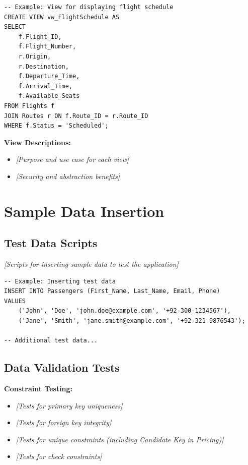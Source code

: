 \documentclass[12pt,a4paper,openany]{report}
\begin{document}
\begin{lstlisting}[caption={Sample View - Flight Schedule}]
-- Example: View for displaying flight schedule
CREATE VIEW vw_FlightSchedule AS
SELECT 
    f.Flight_ID,
    f.Flight_Number,
    r.Origin,
    r.Destination,
    f.Departure_Time,
    f.Arrival_Time,
    f.Available_Seats
FROM Flights f
JOIN Routes r ON f.Route_ID = r.Route_ID
WHERE f.Status = 'Scheduled';
\end{lstlisting}

\textbf{View Descriptions:}
\begin{itemize}
    \item \textit{[Purpose and use case for each view]}
    \item \textit{[Security and abstraction benefits]}
\end{itemize}

\section{Sample Data Insertion}

\subsection{Test Data Scripts}

\textit{[Scripts for inserting sample data to test the application]}

\begin{lstlisting}[caption={Sample Data Insertion}]
-- Example: Inserting test data
INSERT INTO Passengers (First_Name, Last_Name, Email, Phone) 
VALUES 
    ('John', 'Doe', 'john.doe@example.com', '+92-300-1234567'),
    ('Jane', 'Smith', 'jane.smith@example.com', '+92-321-9876543');

-- Additional test data...
\end{lstlisting}

\subsection{Data Validation Tests}

\textbf{Constraint Testing:}
\begin{itemize}
    \item \textit{[Tests for primary key uniqueness]}
    \item \textit{[Tests for foreign key integrity]}
    \item \textit{[Tests for unique constraints (including Candidate Key in Pricing)]}
    \item \textit{[Tests for check constraints]}
\end{itemize}
\end{document}
